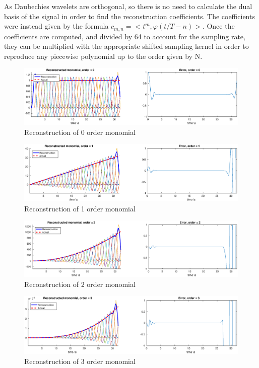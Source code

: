 \documentclass[a4paper]{article}
\begin{document}
As Daubechies wavelets are orthogonal, so there is no need to calculate the dual basis of the signal in order to find the reconstruction coefficients. The coefficients were instead given by the formula $c_{m,n} = <t^m,\varphi(t/T-n)>$. Once the coefficients are computed, and divided by 64 to account for the sampling rate, they can be multiplied with the appropriate shifted sampling kernel in order to reproduce any piecewise polynomial up to the order given by N.

\begin{figure}[H]
    \centering
    \includegraphics[width=\textwidth]{../images/ex1_0}
    \caption{Reconstruction of 0 order monomial}
    \label{fig:ex1_0}
\end{figure}

\begin{figure}[H]
    \centering
    \includegraphics[width=\textwidth]{../images/ex1_1}
    \caption{Reconstruction of 1 order monomial}
    \label{fig:ex1_1}
\end{figure}

\begin{figure}[H]
    \centering
    \includegraphics[width=\textwidth]{../images/ex1_2}
    \caption{Reconstruction of 2 order monomial}
    \label{fig:ex1_2}
\end{figure}

\begin{figure}[H]
    \centering
    \includegraphics[width=\textwidth]{../images/ex1_3}
    \caption{Reconstruction of 3 order monomial}
    \label{fig:ex1_3}
\end{figure}
\end{document}
